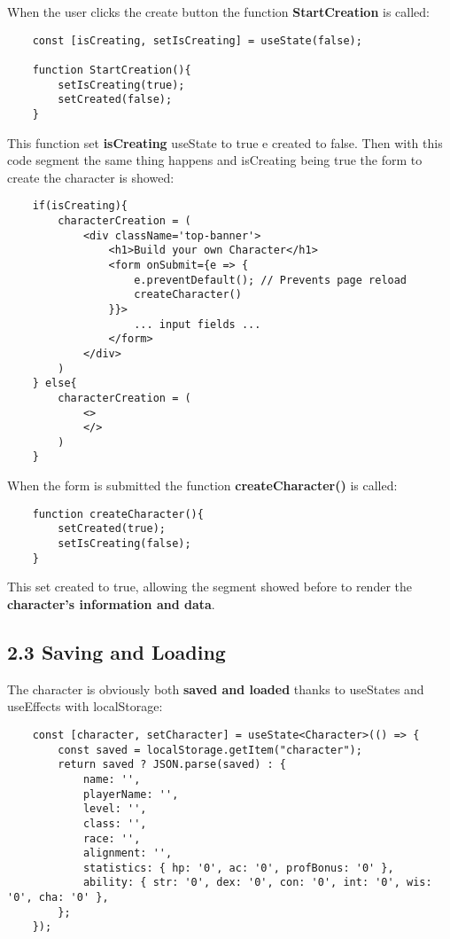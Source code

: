 \documentclass[
]{article}
\begin{document}
\begin{flushleft}
When the user clicks the create button the function \textbf{StartCreation} is called:

\begin{verbatim}
    const [isCreating, setIsCreating] = useState(false);

    function StartCreation(){
        setIsCreating(true);
        setCreated(false);
    }
\end{verbatim}

This function set \textbf{isCreating} useState to true e created to false.
Then with this code segment the same thing happens and isCreating being true the form to create the character is showed:

\begin{verbatim}
    if(isCreating){
        characterCreation = (
            <div className='top-banner'>
                <h1>Build your own Character</h1>
                <form onSubmit={e => {
                    e.preventDefault(); // Prevents page reload
                    createCharacter()
                }}>
                    ... input fields ...
                </form>
            </div>
        )
    } else{
        characterCreation = (
            <>
            </>
        )
    }
\end{verbatim}

When the form is submitted the function \textbf{createCharacter()} is called:

\begin{verbatim}
    function createCharacter(){
        setCreated(true);
        setIsCreating(false);
    }
\end{verbatim}

This set created to true, allowing the segment showed before to render the \textbf{character's information and data}.

\subsection{2.3 Saving and Loading}\label{charloadingsaving}

The character is obviously both \textbf{saved and loaded} thanks to useStates and useEffects with localStorage:

\begin{verbatim}
    const [character, setCharacter] = useState<Character>(() => {
        const saved = localStorage.getItem("character");
        return saved ? JSON.parse(saved) : {
            name: '',
            playerName: '',
            level: '',
            class: '',
            race: '',
            alignment: '',
            statistics: { hp: '0', ac: '0', profBonus: '0' },
            ability: { str: '0', dex: '0', con: '0', int: '0', wis: '0', cha: '0' },
        };
    });


\end{verbatim}
\end{flushleft}
\end{document}

